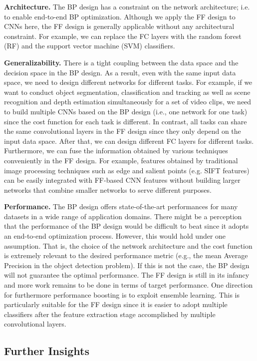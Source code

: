\documentclass[preprint,12pt]{elsarticle}
\begin{document}
{\bf Architecture.} The BP design has a constraint on the network
architecture; i.e. to enable end-to-end BP optimization.  Although we
apply the FF design to CNNs here, the FF design is generally applicable
without any architectural constraint. For example, we can replace the FC
layers with the random forest (RF) and the support vector machine (SVM)
classifiers. 

{\bf Generalizability.} There is a tight coupling between the data space
and the decision space in the BP design. As a result, even with the same
input data space, we need to design different networks for different
tasks. For example, if we want to conduct object segmentation,
classification and tracking as well as scene recognition and depth
estimation simultaneously for a set of video clips, we need to build
multiple CNNs based on the BP design (i.e., one network for one task)
since the cost function for each task is different. In contrast, all
tasks can share the same convolutional layers in the FF design since
they only depend on the input data space. After that, we can design
different FC layers for different tasks.  Furthermore, we can fuse the
information obtained by various techniques conveniently in the FF
design. For example, features obtained by traditional image processing
techniques such as edge and salient points (e.g. SIFT features) can be
easily integrated with FF-based CNN features without building larger
networks that combine smaller networks to serve different purposes. 

{\bf Performance.} The BP design offers state-of-the-art performances
for many datasets in a wide range of application domains. There might be
a perception that the performance of the BP design would be difficult to
beat since it adopts an end-to-end optimization process. However, this
would hold under one assumption. That is, the choice of the network
architecture and the cost function is extremely relevant to the desired
performance metric (e.g., the mean Average Precision in the object
detection problem). If this is not the case, the BP design will not
guarantee the optimal performance. The FF design is still in its infancy
and more work remains to be done in terms of target performance. One
direction for furthermore performance boosting is to exploit ensemble
learning. This is particularly suitable for the FF design since it is
easier to adopt multiple classifiers after the feature extraction stage
accomplished by multiple convolutional layers. 

\subsection{Further Insights}\label{subsec:relationship}
\end{document}

